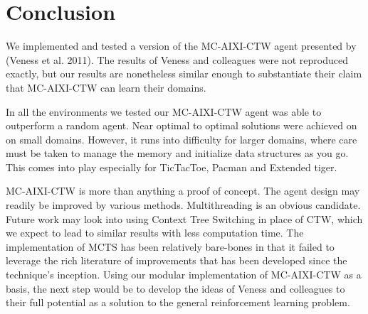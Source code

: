 \documentclass{article}
\theoremstyle{definition}
\newtheorem{primary statistics}[definition]{Primary Statistics}
\newtheorem{auxiliary statistics}[definition]{Auxiliary Statistics}
\begin{document}
\section{Conclusion}
We implemented and tested a version of the MC-AIXI-CTW agent presented by (Veness et al. 2011). The results of Veness and colleagues were not reproduced exactly, but our results are nonetheless similar enough to substantiate their claim that MC-AIXI-CTW can learn their domains.

In all the environments we tested our MC-AIXI-CTW agent was able to outperform a random agent. Near optimal to optimal solutions were achieved on on small domains. However, it runs into difficulty for larger domains, where care must be taken to manage the memory and initialize data structures as you go. This comes into play especially for TicTacToe, Pacman and Extended tiger. 

MC-AIXI-CTW is more than anything a proof of concept. The agent design may readily be improved by various methods. Multithreading is an obvious candidate. Future work may look into using Context Tree Switching in place of CTW, which we expect to lead to similar results with less computation time. The implementation of MCTS has been relatively bare-bones in that it failed to leverage the rich literature of improvements that has been developed since the technique's inception. Using our modular implementation of MC-AIXI-CTW as a basis, the next step would be to develop the ideas of Veness and colleagues to their full potential as a solution to the general reinforcement learning problem. 

\printbibliography
\end{document}
